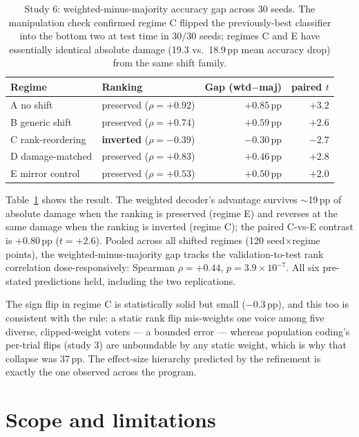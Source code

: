 \documentclass[aps,prapplied,preprint,amsmath,amssymb,floatfix]{revtex4-2}
\begin{document}
\begin{table}[t]
\caption{Study 6: weighted-minus-majority accuracy gap across 30 seeds.
The manipulation check confirmed regime C flipped the previously-best
classifier into the bottom two at test time in 30/30 seeds; regimes C and
E have essentially identical absolute damage (19.3 vs.\ 18.9\,pp mean
accuracy drop) from the same shift family.}
\label{tab:study6}
\begin{ruledtabular}
\begin{tabular}{llrr}
Regime & Ranking & Gap (wtd$-$maj) & paired $t$ \\
\hline
A no shift          & preserved ($\rho=+0.92$) & $+0.85$\,pp & $+3.2$ \\
B generic shift     & preserved ($\rho=+0.74$) & $+0.59$\,pp & $+2.6$ \\
C rank-reordering   & \textbf{inverted} ($\rho=-0.39$) & $\mathbf{-0.30}$\,pp & $\mathbf{-2.7}$ \\
D damage-matched    & preserved ($\rho=+0.83$) & $+0.46$\,pp & $+2.8$ \\
E mirror control    & preserved ($\rho=+0.53$) & $+0.50$\,pp & $+2.0$ \\
\end{tabular}
\end{ruledtabular}
\end{table}

Table~\ref{tab:study6} shows the result. The weighted decoder's advantage
survives $\sim$19\,pp of absolute damage when the ranking is preserved
(regime E) and reverses at the same damage when the ranking is inverted
(regime C); the paired C-vs-E contrast is $+0.80$\,pp ($t=+2.6$). Pooled
across all shifted regimes (120 seed$\times$regime points), the
weighted-minus-majority gap tracks the validation-to-test rank
correlation dose-responsively: Spearman $\rho=+0.44$,
$p=3.9\times10^{-7}$. All six pre-stated predictions held, including the
two replications.

The sign flip in regime C is statistically solid but small
($-0.3$\,pp), and this too is consistent with the rule: a static rank
flip mis-weights one voice among five diverse, clipped-weight voters ---
a bounded error --- whereas population coding's per-trial flips (study 3)
are unboundable by any static weight, which is why that collapse was
37\,pp. The effect-size hierarchy predicted by the refinement is exactly
the one observed across the program.

\section{Scope and limitations}
\end{document}
